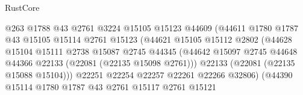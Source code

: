 \begin{lexlean}{RustCore}
\begin{coremodule}
                                        @263
                                        @1788
                                        @43
                                        @2761
                                        @3224
                                        @15105
                                        @15123
                                        @44609
                                        (@44611
                                          @1780
                                          @1787
                                          @43
                                          @15105
                                          @15114
                                          @2761
                                          @15123
                                          (@44621
                                            @15105
                                            @15112
                                            @2802
                                            (@44628
                                              @15104
                                              @15111
                                              @2738
                                              @15087
                                              @2745
                                              @44345
                                              (@44642
                                                @15097
                                                @2745
                                                @44648
                                                @44366
                                                @22133
                                                (@22081 (@22135 @15098 @2761)))
                                              @22133
                                              (@22081 (@22135 @15088 @15104)))
                                            @22251
                                            @22254
                                            @22257
                                            @22261
                                            @22266
                                            @32806)
                                          (@44390
                                            @15114
                                            @1780
                                            @1787
                                            @43
                                            @2761
                                            @15117
                                            @2761
                                            @15121

\end{coremodule}
\end{lexlean}
